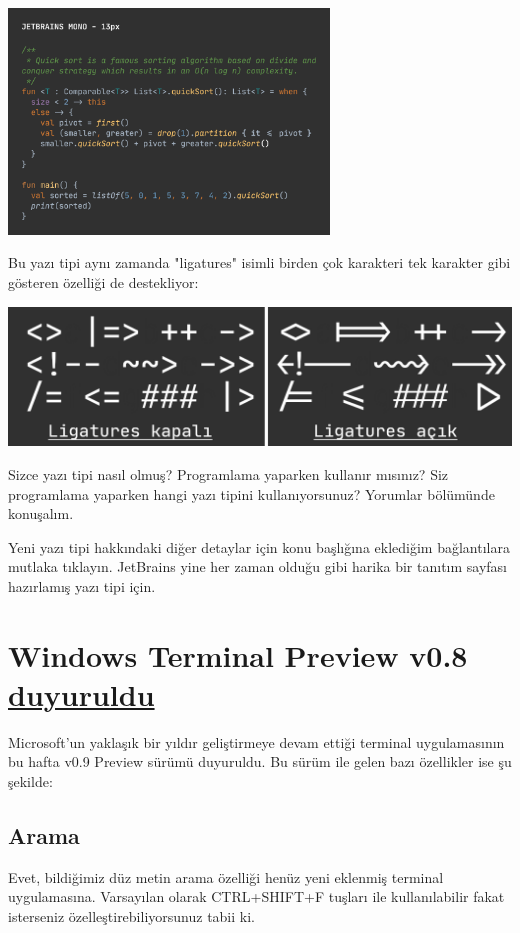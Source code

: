 \documentclass[11pt]{article}
\begin{document}
\begin{center}
\includegraphics[height=6cm]{gorseller/jetbrains-mono-demo2.png}
\end{center}

Bu yazı tipi aynı zamanda "ligatures" isimli birden çok karakteri tek karakter
gibi gösteren özelliği de destekliyor:

\begin{center}
\includegraphics[width=.9\linewidth]{gorseller/jetbrains-mono-ligatures.png}
\end{center}

Sizce yazı tipi nasıl olmuş? Programlama yaparken kullanır mısınız? Siz
programlama yaparken hangi yazı tipini kullanıyorsunuz? Yorumlar bölümünde
konuşalım.

Yeni yazı tipi hakkındaki diğer detaylar için konu başlığına eklediğim
bağlantılara mutlaka tıklayın. JetBrains yine her zaman olduğu gibi harika bir
tanıtım sayfası hazırlamış yazı tipi için.
\section{Windows Terminal Preview v0.8 \href{https://devblogs.microsoft.com/commandline/windows-terminal-preview-v0-8-release/}{duyuruldu}}
\label{sec:org14082c8}
Microsoft'un yaklaşık bir yıldır geliştirmeye devam ettiği terminal
uygulamasının bu hafta v0.9 Preview sürümü duyuruldu. Bu sürüm ile gelen bazı
özellikler ise şu şekilde:
\subsection{Arama}
\label{sec:orgf439f93}
Evet, bildiğimiz düz metin arama özelliği henüz yeni eklenmiş terminal
uygulamasına. Varsayılan olarak CTRL+SHIFT+F tuşları ile kullanılabilir fakat
isterseniz özelleştirebiliyorsunuz tabii ki.
\end{document}
